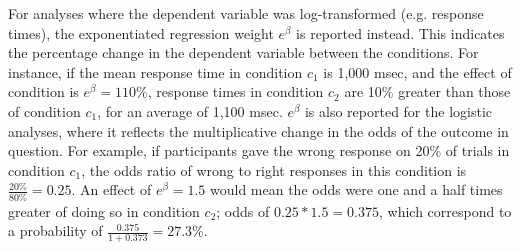 For analyses where the dependent variable was log-transformed (e.g. response times),
the exponentiated regression weight $e^{\beta}$ is reported instead.
This indicates the percentage change in the dependent variable
between the conditions.
For instance, if the mean response time in condition $c_1$ is 1,000 msec,
and the effect of condition is $e^{\beta} = 110\%$,
response times in condition $c_2$ are
10\% greater than those of condition $c_1$, for an average of 1,100 msec.
$e^{\beta}$ is also reported for the logistic analyses,
where it reflects the multiplicative change in the odds of the outcome in question.
For example, if participants
gave the wrong response on 20\% of trials in condition $c_1$,
the odds ratio of wrong to right responses in this condition is $\frac{20\%}{80\%} = 0.25$.
An effect of $e^{\beta} = 1.5$ would mean
the odds were one and a half times greater of doing so in condition $c_2$;
odds of $0.25 * 1.5 = 0.375$,
which correspond to a probability of $\frac{0.375}{1 + 0.373} = 27.3\%$.
